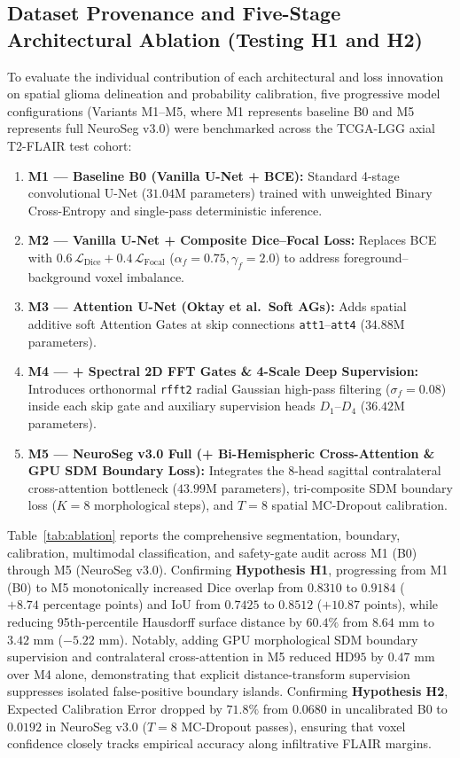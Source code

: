 \documentclass[conference]{IEEEtran}
\begin{document}
\subsection{Dataset Provenance and Five-Stage Architectural Ablation (Testing H1 and H2)}
To evaluate the individual contribution of each architectural and loss innovation on spatial glioma delineation and probability calibration, five progressive model configurations (Variants M1--M5, where M1 represents baseline B0 and M5 represents full NeuroSeg v3.0) were benchmarked across the TCGA-LGG axial T2-FLAIR test cohort:
\begin{enumerate}
    \item \textbf{M1 --- Baseline B0 (Vanilla U-Net + BCE):} Standard 4-stage convolutional U-Net ($31.04\text{M}$ parameters) trained with unweighted Binary Cross-Entropy and single-pass deterministic inference.
    \item \textbf{M2 --- Vanilla U-Net + Composite Dice--Focal Loss:} Replaces BCE with $0.6\,\mathcal{L}_{\text{Dice}} + 0.4\,\mathcal{L}_{\text{Focal}}$ ($\alpha_f = 0.75, \gamma_f = 2.0$) to address foreground--background voxel imbalance.
    \item \textbf{M3 --- Attention U-Net (Oktay et al.\ Soft AGs):} Adds spatial additive soft Attention Gates at skip connections \texttt{att1}--\texttt{att4} ($34.88\text{M}$ parameters).
    \item \textbf{M4 --- + Spectral 2D FFT Gates \& 4-Scale Deep Supervision:} Introduces orthonormal \texttt{rfft2} radial Gaussian high-pass filtering ($\sigma_f = 0.08$) inside each skip gate and auxiliary supervision heads $D_1$--$D_4$ ($36.42\text{M}$ parameters).
    \item \textbf{M5 --- NeuroSeg v3.0 Full (+ Bi-Hemispheric Cross-Attention \& GPU SDM Boundary Loss):} Integrates the 8-head sagittal contralateral cross-attention bottleneck ($43.99\text{M}$ parameters), tri-composite SDM boundary loss ($K = 8$ morphological steps), and $T = 8$ spatial MC-Dropout calibration.
\end{enumerate}

Table~\ref{tab:ablation} reports the comprehensive segmentation, boundary, calibration, multimodal classification, and safety-gate audit across M1 (B0) through M5 (NeuroSeg v3.0). Confirming \textbf{Hypothesis H1}, progressing from M1 (B0) to M5 monotonically increased Dice overlap from $0.8310$ to $0.9184$ ($+8.74\text{ percentage points}$) and IoU from $0.7425$ to $0.8512$ ($+10.87\text{ points}$), while reducing 95th-percentile Hausdorff surface distance by $60.4\%$ from $8.64\text{ mm}$ to $3.42\text{ mm}$ ($-5.22\text{ mm}$). Notably, adding GPU morphological SDM boundary supervision and contralateral cross-attention in M5 reduced $\text{HD95}$ by $0.47\text{ mm}$ over M4 alone, demonstrating that explicit distance-transform supervision suppresses isolated false-positive boundary islands. Confirming \textbf{Hypothesis H2}, Expected Calibration Error dropped by $71.8\%$ from $0.0680$ in uncalibrated B0 to $0.0192$ in NeuroSeg v3.0 ($T = 8$ MC-Dropout passes), ensuring that voxel confidence closely tracks empirical accuracy along infiltrative FLAIR margins.
\end{document}
